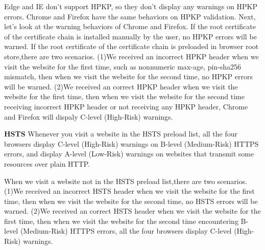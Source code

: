     Edge and IE don't support HPKP, so they don't display any warnings on HPKP errors.
    Chrome and Firefox have the same behaviors on HPKP validation.
    Next, let's look at the warning behaviors of Chrome and Firefox.
    If the root certificate of the certificate chain is installed manually by the user, no HPKP errors will be warned.
    If the root certificate of the certificate chain is preloaded in browser root store,there are two scenarios.
        (1)We received an incorrect HPKP header when we visit the website for the first time, such as nonnumeric max-age, pin-sha256 mismatch, 
        then when we visit the website for the second time, no HPKP errors will be warned.
        (2)We received an correct HPKP header when we visit the website for the first time,
        then when we visit the website for the second time receiving incorrect HPKP header or not receiving any HPKP header, Chrome and Firefox will
        dispaly C-level (High-Risk) warnings.
               
 \textbf{HSTS}    
    Whenever you visit a website in the HSTS preload list, 
        all the four browsers display C-level (High-Risk) warnings on B-level (Medium-Risk) HTTPS errors,
            and display A-level (Low-Risk) warnings on websites that transmit some resources over plain HTTP.
   
    When we visit a website not in the HSTS preload list,there are two scenarios.
        (1)We received an incorrect HSTS header when we visit the website for the first time,
        then when we visit the website for the second time, no HSTS errors will be warned.     
        (2)We received an correct HSTS header when we visit the website for the first time,
        then when we visit the website for the second time encountering B-level (Medium-Risk) HTTPS errors,
        all the four browsers display C-level (High-Risk) warnings.
        


